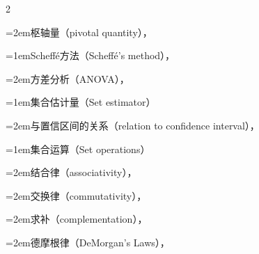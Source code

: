 \begin{multicols}{2}
\par\noindent\hangindent=2em\hspace*{1em}\label{idx:954}枢轴量（pivotal quantity），\hyperref[ex:9.2.7]{\pageref*{ex:9.2.7}}\par
\par\addvspace{2pt}
\par\noindent\hangindent=1em\hspace*{0em}\label{idx:955}Scheffé方法（Scheffé’s method），\hyperref[thm:11.2.10]{\pageref*{thm:11.2.10}}\par
\par\noindent\hangindent=2em\hspace*{1em}\label{idx:956}方差分析（ANOVA），\hyperref[exercise:11.14]{\pageref*{exercise:11.14}}\par
\par\addvspace{2pt}
\par\noindent\hangindent=1em\hspace*{0em}\label{idx:957}集合估计量（Set estimator）\par
\par\noindent\hangindent=2em\hspace*{1em}\label{idx:958}与置信区间的关系（relation to confidence interval），\hyperref[idxocc:958:369]{\pageref*{idxocc:958:369}}\par
\par\addvspace{2pt}
\par\noindent\hangindent=1em\hspace*{0em}\label{idx:959}集合运算（Set operations）\par
\par\noindent\hangindent=2em\hspace*{1em}\label{idx:960}结合律（associativity），\hyperref[thm:1.1.4]{\pageref*{thm:1.1.4}}\par
\par\noindent\hangindent=2em\hspace*{1em}\label{idx:961}交换律（commutativity），\hyperref[thm:1.1.4]{\pageref*{thm:1.1.4}}\par
\par\noindent\hangindent=2em\hspace*{1em}\label{idx:962}求补（complementation），\hyperref[idxocc:962:33]{\pageref*{idxocc:962:33}}\par
\par\noindent\hangindent=2em\hspace*{1em}\label{idx:963}德摩根律（DeMorgan’s Laws），\hyperref[thm:1.1.4]{\pageref*{thm:1.1.4}}\par

\end{multicols}
